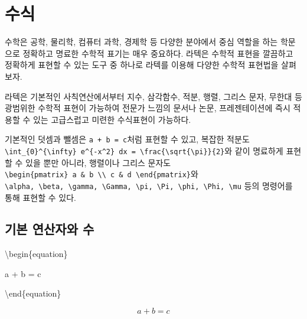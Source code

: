 \documentclass[
  letterpaper,
]{book}
\newenvironment{Shaded}{\begin{snugshade}}{\end{snugshade}}
\newcommand{\ExtensionTok}[1]{\textcolor[rgb]{0.00,0.23,0.31}{#1}}
\newcommand{\KeywordTok}[1]{\textcolor[rgb]{0.00,0.23,0.31}{#1}}
\newcommand{\NormalTok}[1]{\textcolor[rgb]{0.00,0.23,0.31}{#1}}
\newcommand{\SpecialStringTok}[1]{\textcolor[rgb]{0.13,0.47,0.30}{#1}}
\begin{document}
\hypertarget{uxc218uxc2dd}{%
\section{수식}\label{uxc218uxc2dd}}

수학은 공학, 물리학, 컴퓨터 과학, 경제학 등 다양한 분야에서 중심 역할을
하는 학문으로 정확하고 명료한 수학적 표기는 매우 중요하다. 라텍은 수학적
표현을 깔끔하고 정확하게 표현할 수 있는 도구 중 하나로 라텍를 이용해
다양한 수학적 표현법을 살펴보자.

라텍은 기본적인 사칙연산에서부터 지수, 삼각함수, 적분, 행렬, 그리스
문자, 무한대 등 광범위한 수학적 표현이 가능하여 전문가 느낌의 문서나
논문, 프레젠테이션에 즉시 적용할 수 있는 고급스럽고 미련한 수식표현이
가능하다.

기본적인 덧셈과 뺄셈은 \texttt{a\ +\ b\ =\ c}처럼 표현할 수 있고, 복잡한
적분도
\texttt{\textbackslash{}int\_\{0\}\^{}\{\textbackslash{}infty\}\ e\^{}\{-x\^{}2\}\ dx\ =\ \textbackslash{}frac\{\textbackslash{}sqrt\{\textbackslash{}pi\}\}\{2\}}와
같이 명료하게 표현할 수 있을 뿐만 아니라, 행렬이나 그리스 문자도
\texttt{\textbackslash{}begin\{pmatrix\}\ a\ \&\ b\ \textbackslash{}\textbackslash{}\ c\ \&\ d\ \textbackslash{}end\{pmatrix\}}와
\texttt{\textbackslash{}alpha,\ \textbackslash{}beta,\ \textbackslash{}gamma,\ \textbackslash{}Gamma,\ \textbackslash{}pi,\ \textbackslash{}Pi,\ \textbackslash{}phi,\ \textbackslash{}Phi,\ \textbackslash{}mu}
등의 명령어를 통해 표현할 수 있다.

\hypertarget{uxae30uxbcf8-uxc5f0uxc0b0uxc790uxc640-uxc218}{%
\subsection{기본 연산자와
수}\label{uxae30uxbcf8-uxc5f0uxc0b0uxc790uxc640-uxc218}}

\begin{Shaded}
\begin{Highlighting}[]
\KeywordTok{\textbackslash{}begin}\NormalTok{\{}\ExtensionTok{equation}\NormalTok{\}}

\SpecialStringTok{a + b = c}

\KeywordTok{\textbackslash{}end}\NormalTok{\{}\ExtensionTok{equation}\NormalTok{\}}
\end{Highlighting}
\end{Shaded}

\begin{equation}

a + b = c

\end{equation}
\end{document}
